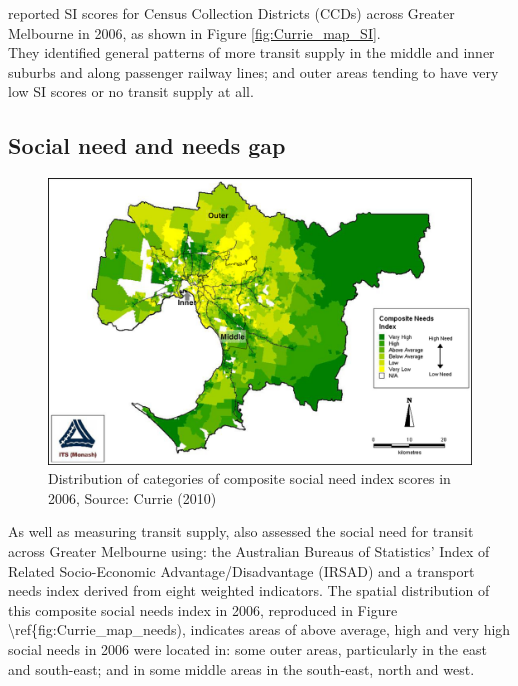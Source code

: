\documentclass[preprint, 3p,
authoryear]{elsarticle} %
\begin{document}
\citet{currie2010identifying} reported SI scores for Census Collection
Districts (CCDs) across Greater Melbourne in 2006, as shown in Figure
\ref{fig:Currie_map_SI}.\\
They identified general patterns of more transit supply in the middle
and inner suburbs and along passenger railway lines; and outer areas
tending to have very low SI scores or no transit supply at all.

\subsection{Social need and needs gap}\label{social-need-and-needs-gap}

\begin{figure}
\includegraphics[width=1\linewidth]{graphics/Currie2010Needs} \caption{Distribution of categories of composite social need index scores in 2006, Source: Currie (2010)}\label{fig:Currie_map_needs}
\end{figure}

As well as measuring transit supply, \citet{currie2010identifying} also
assessed the social need for transit across Greater Melbourne using: the
Australian Bureaus of Statistics' Index of Related Socio-Economic
Advantage/Disadvantage (IRSAD) and a transport needs index derived from
eight weighted indicators. The spatial distribution of this composite
social needs index in 2006, reproduced in Figure
\textbackslash ref\{fig:Currie\_map\_needs), indicates areas of above
average, high and very high social needs in 2006 were located in: some
outer areas, particularly in the east and south-east; and in some middle
areas in the south-east, north and west.
\end{document}
